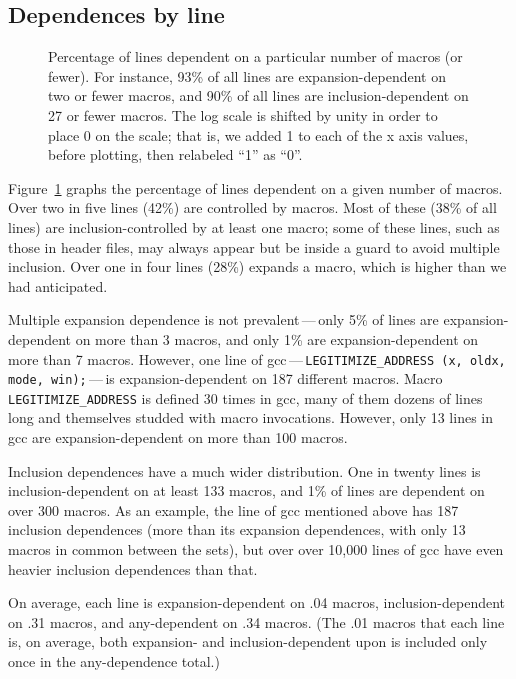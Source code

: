 \documentclass[10pt]{article}
\newcommand{\pkg}[1]{\textsf{#1}}
\begin{document}
\subsection{Dependences by line}

\begin{figure}
\centerline{}

\caption{Percentage of lines dependent on a particular number of macros (or
  fewer).  For instance, 93\% of all lines are expansion-dependent on two
  or fewer macros, and 90\% of all lines are inclusion-dependent on 27 or
  fewer macros.  The log scale is shifted by unity in order to place 0
  on the scale; that is, we added 1 to each of the x axis values, before
  plotting, then relabeled ``1'' as ``0''.}
\label{fig:dep-byline}
\end{figure}

Figure~\ref{fig:dep-byline} graphs the percentage of lines dependent on a
given number of macros.  Over two in five lines (42\%) are controlled by
macros.  Most of these (38\% of all lines) are inclusion-controlled by at
least one macro; some of these lines, such as those in header files, may
always appear but be inside a guard to avoid multiple inclusion.  Over one
in four lines (28\%) expands a macro, which is higher than we had
anticipated.  

Multiple expansion dependence is not prevalent\,---\,only 5\% of lines are
expansion-dependent on more than 3 macros, and only 1\% are
expansion-dependent on more than 7 macros.  However, one line of
\pkg{gcc}\,---\,{\tt \verb|LEGITIMIZE_ADDRESS| (x, oldx, mode,
win);}\,---\,is expansion-dependent on 187 different macros.  Macro
\verb|LEGITIMIZE_ADDRESS| is defined 30 times in \pkg{gcc}, many of them
dozens of lines long and themselves studded with macro invocations.
However, only 13 lines in \pkg{gcc} are expansion-dependent on more than
100 macros.

Inclusion dependences have a much wider distribution.  One in twenty lines
is inclusion-dependent on at least 133 macros, and 1\% of lines are
dependent on over 300 macros.  As an example, the line of \pkg{gcc}
mentioned above has 187 inclusion dependences (more than its expansion
dependences, with only 13 macros in common between the sets), but over over
10,000 lines of \pkg{gcc} have even heavier inclusion dependences than
that.

On average, each line is expansion-dependent on .04 macros,
inclusion-dependent on .31 macros, and any-dependent on .34 macros.  (The
.01 macros that each line is, on average, both expansion- and
inclusion-dependent upon is included only once in the any-dependence
total.)
\end{document}
